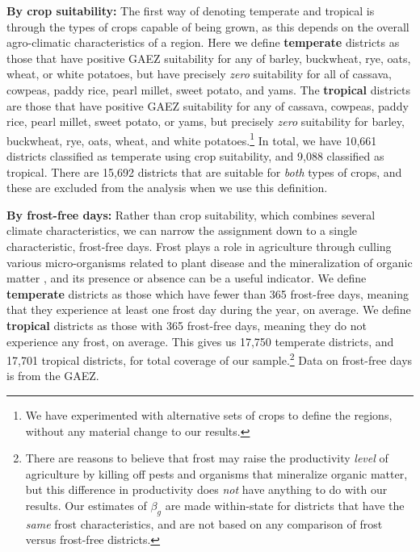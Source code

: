 \documentclass[11pt]{article}
\begin{document}
\vspace{.5cm}\noindent\textbf{By crop suitability:} The first way of denoting temperate and tropical is through the types of crops capable of being grown, as this depends on the overall agro-climatic characteristics of a region. Here we define \textbf{temperate} districts as those that have positive GAEZ suitability for any of barley, buckwheat, rye, oats, wheat, or white potatoes, but have precisely \textit{zero} suitability for all of cassava, cowpeas, paddy rice, pearl millet, sweet potato, and yams. The \textbf{tropical} districts are those that have positive GAEZ suitability for any of cassava, cowpeas, paddy rice, pearl millet, sweet potato, or yams, but precisely \textit{zero} suitability for barley, buckwheat, rye, oats, wheat, and white potatoes.\footnote{We have experimented with alternative sets of crops to define the regions, without any material change to our results.} In total, we have 10,661 districts classified as temperate using crop suitability, and 9,088 classified as tropical. There are 15,692 districts that are suitable for \textit{both} types of crops, and these are excluded from the analysis when we use this definition.

\vspace{.5cm}\noindent\textbf{By frost-free days:} Rather than crop suitability, which combines several climate characteristics, we can narrow the assignment down to a single characteristic, frost-free days. Frost plays a role in agriculture through culling various micro-organisms related to plant disease and the mineralization of organic matter \citep{Masters:2001kl}, and its presence or absence can be a useful indicator. We define \textbf{temperate} districts as those which have fewer than 365 frost-free days, meaning that they experience at least one frost day during the year, on average. We define \textbf{tropical} districts as those with 365 frost-free days, meaning they do not experience any frost, on average. This gives us 17,750 temperate districts, and 17,701 tropical districts, for total coverage of our sample.\footnote{There are reasons to believe that frost may raise the productivity \textit{level} of agriculture by killing off pests and organisms that mineralize organic matter, but this difference in productivity does \textit{not} have anything to do with our results. Our estimates of $\beta_g$ are made within-state for districts that have the \textit{same} frost characteristics, and are not based on any comparison of frost versus frost-free districts.} Data on frost-free days is from the GAEZ.
\end{document}
